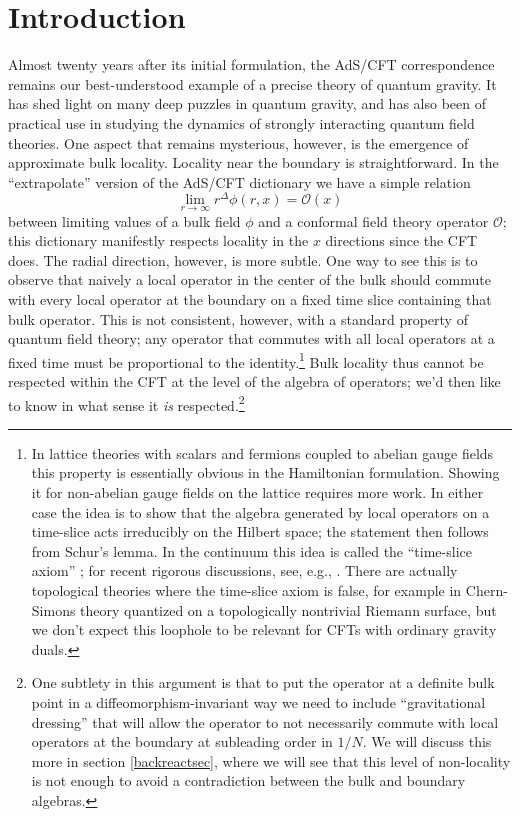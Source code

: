 \documentclass[12pt]{article}
\newcommand{\be}{\begin{equation}}
\newcommand{\ee}{\end{equation}}
\newcommand{\mO}{\mathcal{O}}
\begin{document}
\section{Introduction}
Almost twenty years after its initial formulation, the AdS/CFT correspondence remains our best-understood example of a precise theory of quantum gravity.  It has shed light on many deep puzzles in quantum gravity, and has also been of practical use in studying the dynamics of strongly interacting quantum field theories.  One aspect that remains mysterious, however, is the emergence of approximate bulk locality.  Locality near the boundary is straightforward. In the ``extrapolate'' version of the AdS/CFT dictionary we have a simple relation \cite{Banks:1998dd,Harlow:2011ke}
\be\label{extd}
\lim_{r\to \infty}r^{\Delta}\phi(r,x)=\mO(x)
\ee
between limiting values of a bulk field $\phi$ and a conformal field theory operator $\mO$; this dictionary manifestly respects locality in the $x$ directions since the CFT does.  The radial direction, however, is more subtle. One way to see this is to observe that naively a local operator in the center of the bulk should commute with every local operator at the boundary on a fixed time slice containing that bulk operator. This is not consistent, however, with a standard property of quantum field theory; any operator that commutes with all local operators at a fixed time must be proportional to the identity.\footnote{In lattice theories with scalars and fermions coupled to abelian gauge fields this property is essentially obvious in the Hamiltonian formulation.  Showing it for non-abelian gauge fields on the lattice requires more work.  In either case the idea is to show that the algebra generated by local operators on a time-slice acts irreducibly on the Hilbert space; the statement then follows from Schur's lemma.  In the continuum this idea is called the ``time-slice axiom'' \cite{Streater:1989vi,Haag:1992hx}; for recent rigorous discussions, see, e.g., \cite{Chilian:2008ye,Benini:2013ita}.  There are actually topological theories where the time-slice axiom is false, for example in Chern-Simons theory quantized on a topologically nontrivial Riemann surface, but we don't expect this loophole to be relevant for CFTs with ordinary gravity duals.%
}
Bulk locality thus cannot be respected within the CFT at the level of the algebra of operators;  we'd then like to know in what sense it \textit{is} respected.\footnote{One subtlety in this argument is that to put the operator at a definite bulk point in a diffeomorphism-invariant way we need to include ``gravitational dressing'' that will allow the operator to not necessarily commute with local operators at the boundary at subleading order in $1/N$.  We will discuss this more in section \ref{backreactsec}, where we will see that this level of non-locality is not enough to avoid a contradiction between the bulk and boundary algebras.}  
\end{document}
